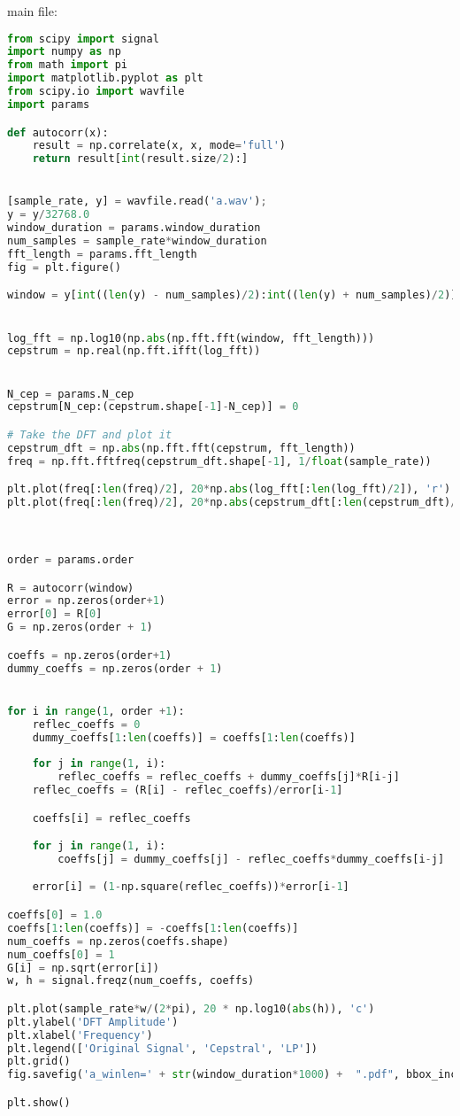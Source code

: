 \documentclass[a4paper]{article}
\begin{document}
main file: 
\begin{lstlisting}[language=Python, caption=q2.py]
from scipy import signal
import numpy as np
from math import pi
import matplotlib.pyplot as plt
from scipy.io import wavfile
import params

def autocorr(x):
    result = np.correlate(x, x, mode='full')
    return result[int(result.size/2):]


[sample_rate, y] = wavfile.read('a.wav');
y = y/32768.0
window_duration = params.window_duration 
num_samples = sample_rate*window_duration
fft_length = params.fft_length
fig = plt.figure()

window = y[int((len(y) - num_samples)/2):int((len(y) + num_samples)/2)]*np.hamming(num_samples)


log_fft = np.log10(np.abs(np.fft.fft(window, fft_length)))
cepstrum = np.real(np.fft.ifft(log_fft))


N_cep = params.N_cep
cepstrum[N_cep:(cepstrum.shape[-1]-N_cep)] = 0

# Take the DFT and plot it
cepstrum_dft = np.abs(np.fft.fft(cepstrum, fft_length))
freq = np.fft.fftfreq(cepstrum_dft.shape[-1], 1/float(sample_rate))

plt.plot(freq[:len(freq)/2], 20*np.abs(log_fft[:len(log_fft)/2]), 'r')
plt.plot(freq[:len(freq)/2], 20*np.abs(cepstrum_dft[:len(cepstrum_dft)/2]), 'b')



order = params.order

R = autocorr(window)
error = np.zeros(order+1)
error[0] = R[0]
G = np.zeros(order + 1)

coeffs = np.zeros(order+1)
dummy_coeffs = np.zeros(order + 1)


for i in range(1, order +1):
    reflec_coeffs = 0
    dummy_coeffs[1:len(coeffs)] = coeffs[1:len(coeffs)]
    
    for j in range(1, i):
        reflec_coeffs = reflec_coeffs + dummy_coeffs[j]*R[i-j]
    reflec_coeffs = (R[i] - reflec_coeffs)/error[i-1]

    coeffs[i] = reflec_coeffs

    for j in range(1, i):
        coeffs[j] = dummy_coeffs[j] - reflec_coeffs*dummy_coeffs[i-j]

    error[i] = (1-np.square(reflec_coeffs))*error[i-1]

coeffs[0] = 1.0
coeffs[1:len(coeffs)] = -coeffs[1:len(coeffs)]
num_coeffs = np.zeros(coeffs.shape)
num_coeffs[0] = 1
G[i] = np.sqrt(error[i])
w, h = signal.freqz(num_coeffs, coeffs)

plt.plot(sample_rate*w/(2*pi), 20 * np.log10(abs(h)), 'c')
plt.ylabel('DFT Amplitude')
plt.xlabel('Frequency')
plt.legend(['Original Signal', 'Cepstral', 'LP'])
plt.grid()
fig.savefig('a_winlen=' + str(window_duration*1000) +  ".pdf", bbox_inches='tight')

plt.show()
\end{lstlisting}
\end{document}
